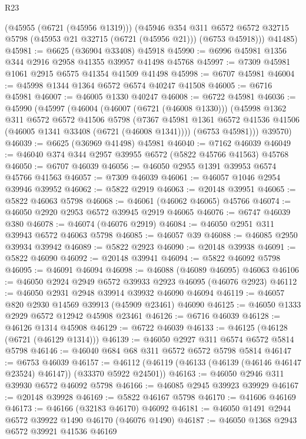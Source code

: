 \begin{lexlean}{R23}
\begin{coremodule}
        (@45955 (@6721 (@45956 @1319)))
        (@45946
          @354
          @311
          @6572
          @6572
          @32715
          @5798
          (@45953 @21 @32715 (@6721 (@45956 @21)))
          (@6753 @45918)))
      @41485)
@45981 := @6625 (@36904 @33408) @45918
@45990 := @6996 @45981 @1356 @344 @2916 @2958 @41355 @39957 @41498 @45768
@45997 := @7309 @45981 @1061 @2915 @6575 @41354 @41509 @41498
@45998 := @6707 @45981
@46004 := @45998 @1344 @1364 @6572 @6574 @40247 @41508
@46005 := @6716 @45981
@46007 := @46005 @1330 @40247
@46008 := @6722 @45981
@46036 := @45990
    (@45997
      (@46004
        (@46007 (@6721 (@46008 @1330)))
        (@45998
          @1362
          @311
          @6572
          @6572
          @41506
          @5798
          (@7367 @45981 @1361 @6572 @41536 @41506 (@46005 @1341 @33408 (@6721 (@46008 @1341))))
          (@6753 @45981)))
      @39570)
@46039 := @6625 (@36969 @41498) @45981
@46040 := @7162 @46039
@46049 := @46040 @374 @344 @2957 @39955 @6572 (@5822 @45766 @41563) @45768
@46050 := @6707 @46039
@46056 := @46050 @2955 @1391 @39953 @6574 @45766 @41563
@46057 := @7309 @46039
@46061 := @46057 @1046 @2954 @39946 @39952
@46062 := @5822 @2919
@46063 := @20148 @39951
@46065 := @5822 @46063 @5798
@46068 := @46061 (@46062 @46065) @45766
@46074 := @46050 @2920 @2953 @6572 @39945 @2919 @46065
@46076 := @6747 @46039 @380
@46078 := @46074 (@46076 @2919)
@46084 := @46050 @2951 @311 @39943 @6572 @46063 @5798
@46085 := @46057 @39
@46088 := @46085 @2950 @39934 @39942
@46089 := @5822 @2923
@46090 := @20148 @39938
@46091 := @5822 @46090
@46092 := @20148 @39941
@46094 := @5822 @46092 @5798
@46095 := @46091 @46094
@46098 := @46088 (@46089 @46095) @46063
@46106 := @46050 @2924 @2949 @6572 @39933 @2923 @46095 (@46076 @2923)
@46112 := @46050 @2931 @2948 @39914 @39932 @46090 @46094
@46119 := @46057 @820 @2930 @14569 @39913 (@45909 @23461) @46090
@46125 := @46050 @1333 @2929 @6572 @12942 @45908 @23461
@46126 := @6716 @46039
@46128 := @46126 @1314 @45908
@46129 := @6722 @46039
@46133 := @46125 (@46128 (@6721 (@46129 @1314)))
@46139 := @46050 @2927 @311 @6574 @6572 @5814 @5798
@46146 := @46040 @684 @68 @311 @6572 @6572 @5798 @5814
@46147 := @6753 @46039
@46157 := @46112 (@46119 (@46133 (@46139 (@46146 @46147 @23524) @46147)) (@33370 @5922 @24501))
@46163 := @46050 @2946 @311 @39930 @6572 @46092 @5798
@46166 := @46085 @2945 @39923 @39929
@46167 := @20148 @39928
@46169 := @5822 @46167 @5798
@46170 := @41606 @46169
@46173 := @46166 (@32183 @46170) @46092
@46181 := @46050 @1491 @2944 @6572 @39922 @1490 @46170 (@46076 @1490)
@46187 := @46050 @1368 @2943 @6572 @39921 @41536 @46169

\end{coremodule}
\end{lexlean}
